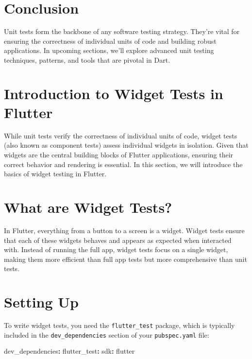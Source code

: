 \documentclass[
]{article}
\newenvironment{Shaded}{\begin{snugshade}}{\end{snugshade}}
\newcommand{\AttributeTok}[1]{\textcolor[rgb]{0.16,0.50,0.73}{#1}}
\newcommand{\FunctionTok}[1]{\textcolor[rgb]{0.56,0.27,0.68}{#1}}
\newcommand{\KeywordTok}[1]{\textcolor[rgb]{0.81,0.81,0.76}{\textbf{#1}}}
\begin{document}
\section{Conclusion}\label{conclusion-3}

Unit tests form the backbone of any software testing strategy. They're
vital for ensuring the correctness of individual units of code and
building robust applications. In upcoming sections, we'll explore
advanced unit testing techniques, patterns, and tools that are pivotal
in Dart.

\section{Introduction to Widget Tests in
Flutter}\label{introduction-to-widget-tests-in-flutter}

While unit tests verify the correctness of individual units of code,
widget tests (also known as component tests) assess individual widgets
in isolation. Given that widgets are the central building blocks of
Flutter applications, ensuring their correct behavior and rendering is
essential. In this section, we will introduce the basics of widget
testing in Flutter.

\section{What are Widget Tests?}\label{what-are-widget-tests}

In Flutter, everything from a button to a screen is a widget. Widget
tests ensure that each of these widgets behaves and appears as expected
when interacted with. Instead of running the full app, widget tests
focus on a single widget, making them more efficient than full app tests
but more comprehensive than unit tests.

\section{Setting Up}\label{setting-up}

To write widget tests, you need the \texttt{flutter\_test} package,
which is typically included in the \texttt{dev\_dependencies} section of
your \texttt{pubspec.yaml} file:

\begin{Shaded}
\begin{Highlighting}[]
\FunctionTok{dev\_dependencies}\KeywordTok{:}
\AttributeTok{  }\FunctionTok{flutter\_test}\KeywordTok{:}
\AttributeTok{    }\FunctionTok{sdk}\KeywordTok{:}\AttributeTok{ flutter}
\end{Highlighting}
\end{Shaded}
\end{document}
